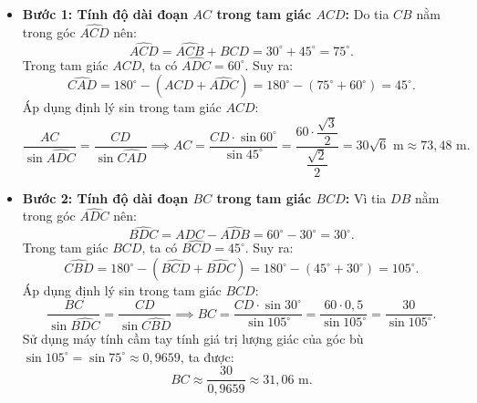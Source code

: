 \documentclass[12pt,a4paper]{article}
\begin{document}
\begin{enumerate}[leftmargin=0.6cm, itemsep=6pt]
\begin{center}
    \end{center}

    \begin{itemize}
        \item \textbf{Bước 1: Tính độ dài đoạn $AC$ trong tam giác $ACD$:}
        Do tia $CB$ nằm trong góc $\widehat{ACD}$ nên:
        \[\widehat{ACD} = \widehat{ACB} + \widehat{BCD} = 30^\circ + 45^\circ = 75^\circ.\]
        Trong tam giác $ACD$, ta có $\widehat{ADC} = 60^\circ$. Suy ra:
        \[\widehat{CAD} = 180^\circ - (\widehat{ACD} + \widehat{ADC}) = 180^\circ - (75^\circ + 60^\circ) = 45^\circ.\]
        Áp dụng định lý sin trong tam giác $ACD$:
        \[\dfrac{AC}{\sin \widehat{ADC}} = \dfrac{CD}{\sin \widehat{CAD}} \implies AC = \dfrac{CD \cdot \sin 60^\circ}{\sin 45^\circ} = \dfrac{60 \cdot \dfrac{\sqrt{3}}{2}}{\dfrac{\sqrt{2}}{2}} = 30\sqrt{6}\text{ m} \approx 73,48\text{ m}.\]

        \item \textbf{Bước 2: Tính độ dài đoạn $BC$ trong tam giác $BCD$:}
        Vì tia $DB$ nằm trong góc $\widehat{ADC}$ nên:
        \[\widehat{BDC} = \widehat{ADC} - \widehat{ADB} = 60^\circ - 30^\circ = 30^\circ.\]
        Trong tam giác $BCD$, ta có $\widehat{BCD} = 45^\circ$. Suy ra:
        \[\widehat{CBD} = 180^\circ - (\widehat{BCD} + \widehat{BDC}) = 180^\circ - (45^\circ + 30^\circ) = 105^\circ.\]
        Áp dụng định lý sin trong tam giác $BCD$:
        \[\dfrac{BC}{\sin \widehat{BDC}} = \dfrac{CD}{\sin \widehat{CBD}} \implies BC = \dfrac{CD \cdot \sin 30^\circ}{\sin 105^\circ} = \dfrac{60 \cdot 0,5}{\sin 105^\circ} = \dfrac{30}{\sin 105^\circ}.\]
        Sử dụng máy tính cầm tay tính giá trị lượng giác của góc bù $\sin 105^\circ = \sin 75^\circ \approx 0,9659$, ta được:
        \[BC \approx \dfrac{30}{0,9659} \approx 31,06\text{ m}.\]


\end{itemize}
\end{enumerate}
\end{document}
